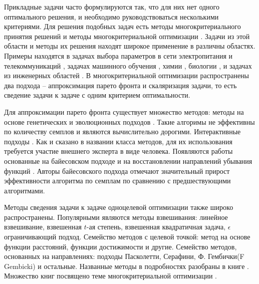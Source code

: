 Прикладные задачи часто формулируются так, что для них нет одного оптимального решения, и необходимо руководствоваться несколькими критериями. Для решения подобных задач есть методы многокритериального принятия решений и методы многокритериальной оптимизации \cite{koksalan2011multiple}. Задачи из этой области и методы их решения находят широкое применение в различны областях. Примеры находятся в задачах выбора параметров в сети электропитания и телекоммуникаций \cite{altiparmak2006genetic, elmusrati2008applications, mastrocinque2013multi, bjornson2014multiobjective}, задачах машинного обучения \cite{suttorp2006multi, zuluaga2013active, sener2018multi}, химии \cite{rangaiah2013multi}, биологии \cite{boada2016multi}, и задачах  из инженерных областей \cite{marler2004survey}.  В многокритериальной оптимизации распространены два подхода -- аппроксимация парето фронта и скаляризация задачи, то есть сведение задачи к задаче с одним критерием оптимальности.

Для аппроксимации парето фронта существует множество методов: методы на основе генетических и эволюционных подходов  \cite{ngatchou2005pareto, konak2006multi}. Такие алгоримы не эффективны по количеству семплов и являются вычислительно дорогими.
Интерактивные подходы \cite{miettinen2008introduction}. Как и сказано в названии класса методов, для их использования требуется участие внешнего эксперта в виде человека.
Появляются работы основанные на байесовском подходе \cite{suzuki2020multi,daulton2022multi} и на восстановлении направлений убывания функций \cite{gebken2021efficient}. Авторы байесовского подхода отмечают значительный прирост эффективности алгоритма по семплам по сравнению с предшествующими алгоритмами. 


Методы сведения задачи к задаче одноцелевой оптимизации также широко распространены. Популярными являются методы взвешивания: линейное взвешивание, взвешенная $t$-ая степень, взвешенная квадратичная задача, $\epsilon$ ограничивающий подход. Семейство методов с целевой точкой: метод на основе функции расстояний, функции достижимости и другие. Семейство методов, основанных на направлениях: подходы Пасколетти, Серафини, Ф. Гембички(F Gembicki) и остальные. Названные методы в подробностях разобраны в книге \cite{greco2006multiple}. Множество книг посвящено теме многокритериальной оптимизации \cite{miettinen1999nonlinear,greco2006multiple,koksalan2011multiple}.


